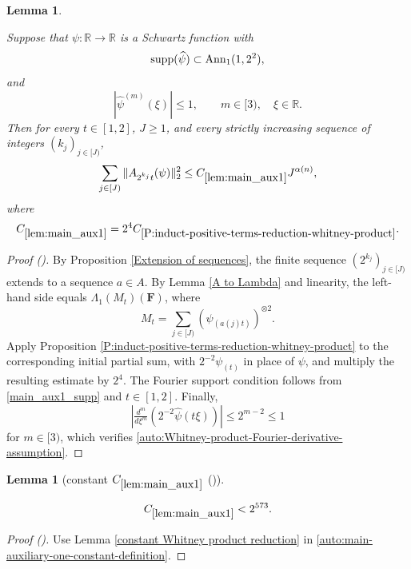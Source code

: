 \documentclass[12pt,reqno]{amsart}
\newcommand{\auto}{{({\tiny\faCar})}}
\theoremstyle{plain}
\newtheorem{lemma}[theorem]{Lemma}
\numberwithin{equation}{section}
\theoremstyle{remark}
\newcommand{\uses}[1]{}
\newcommand{\usesdefs}[1]{}
\newcommand{\leanok}{}
\newcommand{\lean}[1]{}
\newcommand{\R}{{\mathbb R}}
\newcommand{\F}{\mathbf{F}}
\begin{document}
\begin{lemma}\label{lem:main_aux1}\uses{Extension of sequences,A to Lambda,P:induct-positive-terms-reduction-whitney-product}\usesdefs{A_def,normalized function tuples,auto:prism-form-definition,multiplicatively spaced monotone sequences}
\lean{Auto.mainAuxOne}
\leanok
Suppose that $\psi:\R\to\R$ is a Schwartz function with
\begin{equation}\label{main_aux1_supp}
{\rm supp}(\widehat\psi)\subset\mathrm{Ann}_1(1,2^2),
\end{equation}
and
\begin{equation}\label{auto:main-auxiliary-one-Fourier-derivative-assumption}
|\widehat\psi^{(m)}(\xi)|\le1,
\qquad
m\in[3),
\quad
\xi\in\R.
\end{equation}
Then for every $t\in[1,2]$, $J\ge1$, and every strictly increasing sequence of integers $(k_j)_{j\in[J)}$,
\begin{equation}\label{main_aux1}
\sum_{j\in[J)}\|A_{2^{k_j}t}(\psi)\|_2^2
\le C_{\ref{lem:main_aux1}}J^{\alpha(n)},
\end{equation}
where
\begin{equation}\label{auto:main-auxiliary-one-constant-definition}
C_{\ref{lem:main_aux1}}
=2^4C_{\ref{P:induct-positive-terms-reduction-whitney-product}}.
\end{equation}
\end{lemma}

\begin{proof}[Proof \auto]
By Proposition \ref{Extension of sequences}, the finite sequence $(2^{k_j})_{j\in[J)}$ extends to a sequence $a\in A$. By Lemma \ref{A to Lambda} and linearity, the left-hand side equals $\Lambda_1(M_t)(\F)$, where
\[
M_t=\sum_{j\in[J)}(\psi_{(a(j)t)})^{\otimes2}.
\]
Apply Proposition \ref{P:induct-positive-terms-reduction-whitney-product} to the corresponding initial partial sum, with $2^{-2}\psi_{(t)}$ in place of $\psi$, and multiply the resulting estimate by $2^4$. The Fourier support condition follows from \eqref{main_aux1_supp} and $t\in[1,2]$. Finally,
\[
\left|\tfrac{d^m}{d\xi^m}
\left(2^{-2}\widehat\psi(t\xi)\right)\right|
\le2^{m-2}\le1
\]
for $m\in[3)$, which verifies \eqref{auto:Whitney-product-Fourier-derivative-assumption}.
\end{proof}

\begin{lemma}[constant $C_{\ref{lem:main_aux1}}$ \auto]\label{constant main auxiliary one}\uses{constant Whitney product reduction,lem:main_aux1}\usesdefs{}
\lean{Auto.constantMainAuxiliaryOne}
\leanok
\begin{equation}\label{constant main auxiliary one bound}
C_{\ref{lem:main_aux1}}<2^{573}.
\end{equation}
\end{lemma}
\begin{proof}[Proof \auto]
Use Lemma \ref{constant Whitney product reduction} in \eqref{auto:main-auxiliary-one-constant-definition}.
\end{proof}
\end{document}
